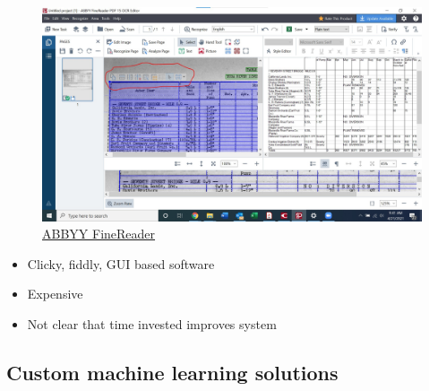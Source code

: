 \documentclass[
  letterpaper,
  DIV=11,
  numbers=noendperiod]{scrartcl}
\providecommand{\tightlist}{%
  \setlength{\itemsep}{0pt}\setlength{\parskip}{0pt}}\usepackage{longtable,booktabs,array}
\begin{document}
\begin{figure}

{\centering \includegraphics{assets/orc_hard_solution.jpg}

}

\caption{\href{https://bendingwater-blog.library.claremont.edu/2021/04/21/a-look-inside-the-data-ocr-process-and-challenging-tables/}{ABBYY
FineReader}}

\end{figure}

\begin{itemize}
\tightlist
\item
  Clicky, fiddly, GUI based software
\item
  Expensive
\item
  Not clear that time invested improves system
\end{itemize}

\hypertarget{custom-machine-learning-solutions}{%
\subsection{Custom machine learning
solutions}\label{custom-machine-learning-solutions}}
\end{document}
